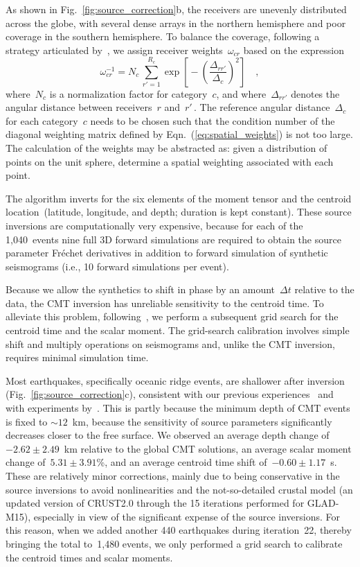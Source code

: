 \documentclass[extra,mreferee]{gji}
\begin{document}
As shown in Fig.~\ref{fig:source_correction}b,
the receivers are unevenly distributed across the globe,
with several dense arrays in the northern hemisphere and poor coverage in the southern hemisphere.
To balance the coverage,
following a strategy articulated by~\cite{Ruanetal2018},
we assign receiver weights~$\omega_{cr}$ based on the expression
\begin{equation}
\omega_{cr}^{-1} = N_c\,\sum_{r'=1}^{R_c} \exp\left[\mbox{}-\left(\frac{\Delta_{rr'}}{\Delta_c}\right)^2\right]
\quad ,
\label{eq:spatial_weights}
\end{equation}
where~$N_c$ is a normalization factor for category~$c$,
and where~$\Delta_{rr'}$ denotes the angular distance between receivers~$r$ and~$r'$\,.
The reference angular distance~$\Delta_c$ for each category~$c$ needs to be chosen such that the condition 
number of the diagonal weighting matrix defined by Eqn.~(\ref{eq:spatial_weights}) is not too large.
The calculation of the weights may be abstracted as: given a distribution of
points on the unit sphere, determine a spatial weighting associated with each point.

The algorithm inverts for the six elements of the moment tensor
and the centroid location~(latitude, longitude, and depth; duration is kept constant).
These source inversions are computationally very expensive,
because for each of the 1,040~events nine full 3D forward simulations are required to obtain the source parameter Fr\'echet derivatives in addition to forward simulation of synthetic seismograms (i.e., 10 forward simulations per event).

Because we allow the synthetics to shift in phase by an amount~$\Delta t$ relative to the data,
the CMT inversion has unreliable sensitivity to the centroid time.
To alleviate this problem,
following~\cite{zhu2012structure},
we perform a subsequent grid search for the centroid time and the scalar moment.
The grid-search calibration involves simple shift and multiply operations on seismograms
and, unlike the CMT inversion, requires minimal simulation time.

Most earthquakes, specifically oceanic ridge events, are shallower after inversion
(Fig.~\ref{fig:source_correction}c),
consistent with our previous experiences~\citep[e.g.,][]{zhu2015seismic,chen2015multiparameter,bozdaug2016global} and with experiments by~\cite{hjorleifsdottir2010effects}. This is partly because the minimum depth of CMT events is fixed to $\sim12$~km, because the sensitivity of source parameters significantly decreases closer to the free surface. 
We observed an average depth change of~$-2.62\pm2.49$~km relative to the global CMT solutions,
an average scalar moment change of~$5.31\pm3.91$\%,
and an average centroid time shift of~$-0.60\pm1.17$~s.
These are relatively minor corrections, mainly due to being conservative in the source inversions to avoid nonlinearities and the not-so-detailed crustal model (an updated version of CRUST2.0 through the 15 iterations performed for GLAD-M15), especially in view of the significant expense of the source inversions.
For this reason, when we added another 440 earthquakes during iteration~22,
thereby bringing the total to~1,480 events,
we only performed a grid search to calibrate the centroid times and scalar moments.
\end{document}
